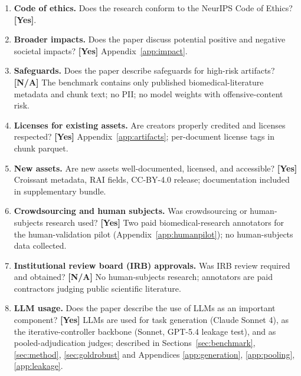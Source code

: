 \documentclass{article}
\begin{document}
\begin{enumerate}
\item \textbf{Code of ethics.} Does the research conform to the NeurIPS Code of Ethics? \textbf{[Yes]}.

\item \textbf{Broader impacts.} Does the paper discuss potential positive and negative societal impacts? \textbf{[Yes]} Appendix~\ref{app:impact}.

\item \textbf{Safeguards.} Does the paper describe safeguards for high-risk artifacts? \textbf{[N/A]} The benchmark contains only published biomedical-literature metadata and chunk text; no PII; no model weights with offensive-content risk.

\item \textbf{Licenses for existing assets.} Are creators properly credited and licenses respected? \textbf{[Yes]} Appendix~\ref{app:artifacts}; per-document license tags in chunk parquet.

\item \textbf{New assets.} Are new assets well-documented, licensed, and accessible? \textbf{[Yes]} Croissant metadata, RAI fields, CC-BY-4.0 release; documentation included in supplementary bundle.

\item \textbf{Crowdsourcing and human subjects.} Was crowdsourcing or human-subjects research used? \textbf{[Yes]} Two paid biomedical-research annotators for the human-validation pilot (Appendix~\ref{app:humanpilot}); no human-subjects data collected.

\item \textbf{Institutional review board (IRB) approvals.} Was IRB review required and obtained? \textbf{[N/A]} No human-subjects research; annotators are paid contractors judging public scientific literature.

\item \textbf{LLM usage.} Does the paper describe the use of LLMs as an important component? \textbf{[Yes]} LLMs are used for task generation (Claude Sonnet 4), as the iterative-controller backbone (Sonnet, GPT-5.4 leakage test), and as pooled-adjudication judges; described in Sections~\ref{sec:benchmark}, \ref{sec:method}, \ref{sec:goldrobust} and Appendices \ref{app:generation}, \ref{app:pooling}, \ref{app:leakage}.
\end{enumerate}
\end{document}
